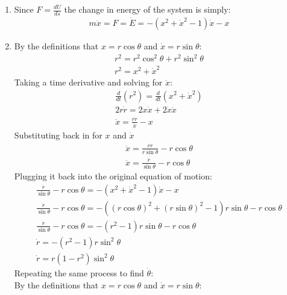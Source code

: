 \documentclass[12pt]{article}
\begin{document}
\begin{enumerate}
\begin{enumerate}
            \item
            Since $F=\frac{dU}{ds}$ the change in energy of the system is simply:
            \begin{gather*}
                m\ddot{x}=F=\dot{E}=-\left(x^2+\dot{x}^2-1\right)\dot{x}-x
            \end{gather*}
            \item
            By the definitions that $x=r\cos\theta$ and $\dot{x}=r\sin\theta$:
            \begin{gather*}
                r^2=r^2\cos^2\theta+r^2\sin^2\theta\\
                r^2=x^2+\dot{x}^2
            \end{gather*}
            Taking a time derivative and solving for $\ddot{x}$:
            \begin{gather*}
                \frac{d}{dt}(r^2)=\frac{d}{dt}\left(x^2+\dot{x}^2\right)\\
                2r\dot{r}=2x\dot{x}+2\dot{x}\ddot{x}\\
                \ddot{x}=\frac{r\dot{r}}{\dot{x}}-x
            \end{gather*}
            Substituting back in for $x$ and $\dot{x}$
            \begin{gather*}
                \ddot{x}=\frac{r\dot{r}}{r\sin\theta}-r\cos\theta\\
                \ddot{x}=\frac{\dot{r}}{\sin\theta}-r\cos\theta
            \end{gather*}
            Plugging it back into the original equation of motion:
            \begin{gather*}
                \frac{\dot{r}}{\sin\theta}-r\cos\theta=-\left(x^2+\dot{x}^2-1\right)\dot{x}-x\\
                \frac{\dot{r}}{\sin\theta}-r\cos\theta=-\left((r\cos\theta)^2+(r\sin\theta)^2-1\right)r\sin\theta-r\cos\theta\\
                \frac{\dot{r}}{\sin\theta}-r\cos\theta=-\left(r^2-1\right)r\sin\theta-r\cos\theta\\
                \dot{r}=-\left(r^2-1\right)r\sin^2\theta\\
                \dot{r}=r\left(1-r^2\right)\sin^2\theta
            \end{gather*}
            Repeating the same process to find $\dot{\theta}$:\\
            By the definitions that $x=r\cos\theta$ and $\dot{x}=r\sin\theta$:
            \begin{gather*}

\end{gather*}
\end{enumerate}
\end{enumerate}
\end{document}

